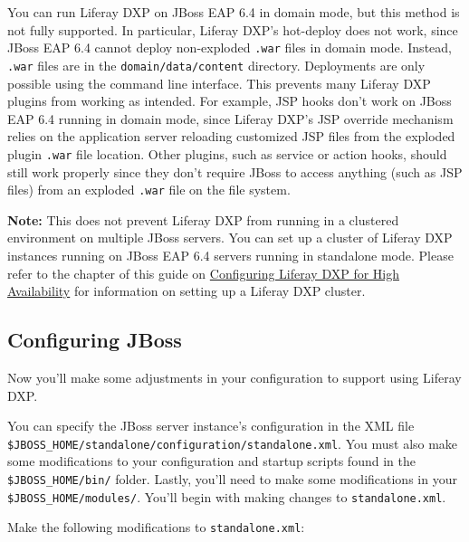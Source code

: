 You can run Liferay DXP on JBoss EAP 6.4 in domain mode, but this method
is not fully supported. In particular, Liferay DXP's hot-deploy does not
work, since JBoss EAP 6.4 cannot deploy non-exploded \texttt{.war} files
in domain mode. Instead, \texttt{.war} files are in the
\texttt{domain/data/content} directory. Deployments are only possible
using the command line interface. This prevents many Liferay DXP plugins
from working as intended. For example, JSP hooks don't work on JBoss EAP
6.4 running in domain mode, since Liferay DXP's JSP override mechanism
relies on the application server reloading customized JSP files from the
exploded plugin \texttt{.war} file location. Other plugins, such as
service or action hooks, should still work properly since they don't
require JBoss to access anything (such as JSP files) from an exploded
\texttt{.war} file on the file system.

\noindent\hrulefill

\textbf{Note:} This does not prevent Liferay DXP from running in a
clustered environment on multiple JBoss servers. You can set up a
cluster of Liferay DXP instances running on JBoss EAP 6.4 servers
running in standalone mode. Please refer to the chapter of this guide on
\href{/docs/6-2/deploy/-/knowledge_base/d/configuring-liferay-for-high-availability}{Configuring
Liferay DXP for High Availability} for information on setting up a
Liferay DXP cluster.

\noindent\hrulefill

\subsection{Configuring JBoss}\label{configuring-jboss}

Now you'll make some adjustments in your configuration to support using
Liferay DXP.

You can specify the JBoss server instance's configuration in the XML
file \texttt{\$JBOSS\_HOME/standalone/configuration/standalone.xml}. You
must also make some modifications to your configuration and startup
scripts found in the \texttt{\$JBOSS\_HOME/bin/} folder. Lastly, you'll
need to make some modifications in your \texttt{\$JBOSS\_HOME/modules/}.
You'll begin with making changes to \texttt{standalone.xml}.

Make the following modifications to \texttt{standalone.xml}:


